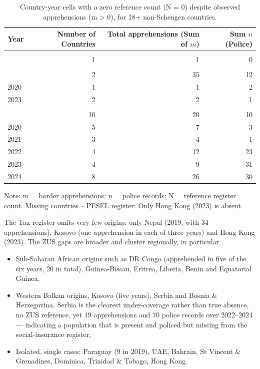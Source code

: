\begin{table}[ht!]
\caption{\label{tbl-zero-counts-assumptions}Country-year cells with a zero reference count (N = 0) despite observed apprehensions (m > 0), for 18+ non-Schengen countries.} 
\fontsize{9.0pt}{11.0pt}\selectfont
\begin{tabular*}{\linewidth}{@{\extracolsep{\fill}}lrrr}
\toprule
Year & Number of Countries & Total apprehensions (Sum of $m$) & Sum $n$ (Police) \\ 
\midrule\addlinespace[2.5pt]
\multicolumn{4}{l}{PESEL} \\[2.5pt] 
\midrule\addlinespace[2.5pt]
2023 & 1 & 1 & 0 \\ 
\midrule\addlinespace[2.5pt]
\multicolumn{4}{l}{Tax} \\[2.5pt] 
\midrule\addlinespace[2.5pt]
2019 & 2 & 35 & 12 \\ 
2020 & 1 & 1 & 2 \\ 
2023 & 2 & 2 & 1 \\ 
\midrule\addlinespace[2.5pt]
\multicolumn{4}{l}{ZUS} \\[2.5pt] 
\midrule\addlinespace[2.5pt]
2019 & 10 & 20 & 10 \\ 
2020 & 5 & 7 & 3 \\ 
2021 & 3 & 4 & 1 \\ 
2022 & 4 & 12 & 23 \\ 
2023 & 4 & 9 & 31 \\ 
2024 & 8 & 26 & 30 \\ 
\bottomrule
\end{tabular*}
\begin{minipage}{\linewidth}
\vspace{.05em}
Note: m = border apprehensions; n = police records; N = reference register count. Missing countries -- PESEL register: Only Hong Kong (2023) is absent.\\
\end{minipage}
\end{table}



The Tax register omits very few origins: only Nepal (2019, with 34 apprehensions), Kosovo (one apprehension in each of three years) and Hong Kong (2023). The ZUS gaps are broader and cluster regionally, in particular

\begin{itemize}
    \item Sub-Saharan African origins such as DR Congo (apprehended in five of the six years, 20 in total), Guinea-Bissau, Eritrea, Liberia, Benin and Equatorial Guinea, 
    \item Western Balkan origins, Kosovo (five years), Serbia and Bosnia \& Herzegovina. Serbia is the clearest under-coverage rather than true absence, no ZUS reference, yet 19 apprehensions and 70 police records over 2022–2024 — indicating a population that is present and policed but missing from the social-insurance register,
    \item Isolated, single cases: Paraguay (9 in 2019), UAE, Bahrain, St Vincent \& Grenadines, Dominica, Trinidad \& Tobago, Hong Kong.
\end{itemize}

